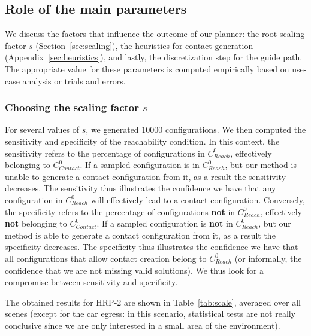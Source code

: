 \documentclass[journal]{IEEEtran}
\newcommand{\gls}[1]{\textit{#1}}
\begin{document}
 
\subsection{Role of the main parameters} \label{sec:influence}
We discuss the factors that influence the outcome of our planner: the root scaling factor $s$ (Section~\ref{sec:scaling}), the heuristics for
contact generation (Appendix~\ref{sec:heuristics}), and lastly, the discretization step for the guide path. The appropriate value for these parameters
is computed empirically based on use-case analysis or trials and errors.
 
\subsubsection{Choosing the scaling factor $s$} \label{sec:params}
For several values of $s$, we generated $10 000$ configurations. 
We then computed the sensitivity and specificity of the reachability condition.  In this context, the sensitivity refers to the percentage of configurations in $C_{Reach}^0$, effectively belonging to \gls{$C_{Contact}^0$}. If a sampled configuration is in $C_{Reach}^0$, but our method is unable to generate a contact configuration from it, as a result the sensitivity
decreases. The sensitivity thus illustrates the confidence we have that any configuration in $C_{Reach}^0$ will effectively lead to a contact configuration.
Conversely, the specificity refers to the percentage of configurations \textbf{not} in $C_{Reach}^0$, effectively \textbf{not} belonging to \gls{$C_{Contact}^0$}.
If a sampled configuration is \textbf{not} in $C_{Reach}^0$, but our method is able to generate a contact configuration from it, as a result the specificity
decreases. The specificity thus illustrates the confidence we have that all configurations that allow contact creation belong to $C_{Reach}^0$ (or informally, the confidence that we are not missing valid solutions).
We thus look for a compromise between sensitivity and specificity.

The obtained results for HRP-2 are shown in Table~\ref{tab:scale}, averaged over all scenes (except for the car egress: in this scenario, 
statistical tests are not really conclusive since we are only interested in a small area of the environment).
\end{document}
